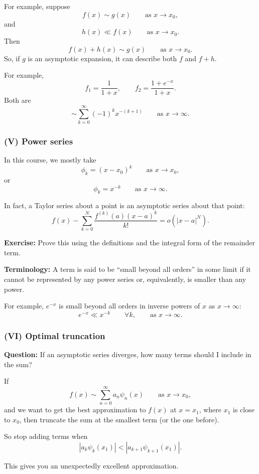 \documentclass[11pt,a4paper]{article}
\begin{document}
For example, suppose
\[
f(x) \sim g(x)
\qquad \text{as } x \to x_0,
\]
and
\[
h(x) \ll f(x)
\qquad \text{as } x \to x_0.
\]
Then
\[
f(x)+h(x) \sim g(x)
\qquad \text{as } x \to x_0.
\]
So, if \(g\) is an asymptotic expansion, it can describe both
\(f\) and \(f+h\).

For example,
\[
f_1 = \frac{1}{1+x},
\qquad
f_2 = \frac{1+e^{-x}}{1+x}.
\]
Both are
\[
\sim \sum_{k=0}^{\infty} (-1)^k x^{-(k+1)}
\qquad \text{as } x \to \infty.
\]

\subsubsection*{(V) Power series}

In this course, we mostly take
\[
\phi_k = (x-x_0)^k
\qquad \text{as } x \to x_0,
\]
or
\[
\phi_k = x^{-k}
\qquad \text{as } x \to \infty.
\]

In fact, a Taylor series about a point is an asymptotic series about
that point:
\[
f(x) -
\sum_{k=0}^{N}
\frac{f^{(k)}(a)(x-a)^k}{k!}
= o\!\left(|x-a|^N\right).
\]

\noindent
\textbf{Exercise:} Prove this using the definitions and the integral
form of the remainder term.

\medskip
\noindent
\textbf{Terminology:} A term is said to be ``small beyond all orders''
in some limit if it cannot be represented by any power series or,
equivalently, is smaller than any power.

For example, \(e^{-x}\) is small beyond all orders in inverse powers
of \(x\) as \(x \to \infty\):
\[
e^{-x} \ll x^{-k}
\qquad \forall k,
\qquad \text{as } x \to \infty.
\]

\subsubsection*{(VI) Optimal truncation}

\noindent
\textbf{Question:} If an asymptotic series diverges, how many terms
should I include in the sum?

If
\[
f(x) \sim \sum_{n=0}^{\infty} a_n \psi_n(x)
\qquad \text{as } x \to x_0,
\]
and we want to get the best approximation to \(f(x)\) at \(x=x_1\),
where \(x_1\) is close to \(x_0\), then truncate the sum at the
smallest term (or the one before).

So stop adding terms when
\[
|a_k\psi_k(x_1) |<| a_{k+1}\psi_{k+1}(x_1)|.
\]

This gives you an unexpectedly excellent approximation.
\end{document}
